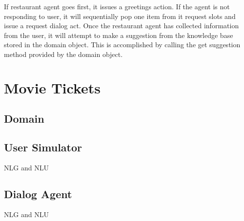 If restaurant agent goes first, it issues a greetings action. If the agent is not responding to user, it will sequentially pop one item from it request slots and issue a request dialog act. Once the restaurant agent has collected information from the user, it will attempt to make a suggestion from the knowledge base stored in the domain object. This is accomplished by calling the get suggestion method provided by the domain object.

\section{Movie Tickets}



\subsection{Domain}

\subsection{User Simulator}

NLG and NLU


\subsection{Dialog Agent}

NLG and NLU


